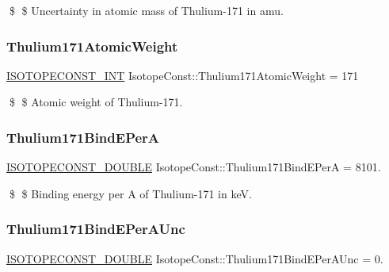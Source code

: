 \$ \$ Uncertainty in atomic mass of Thulium-\/171 in amu. \mbox{\label{group___isotope_const-_thulium-_tm171_ga094fb0dd560ff5fa86ff405571396bdb}} 
\subsubsection{\texorpdfstring{Thulium171\+Atomic\+Weight}{Thulium171AtomicWeight}}
{\footnotesize\ttfamily \mbox{\hyperlink{group___isotope_const-_macros_ga5f18360b3e99483a35c32d789e62621c}{I\+S\+O\+T\+O\+P\+E\+C\+O\+N\+S\+T\+\_\+\+I\+NT}} Isotope\+Const\+::\+Thulium171\+Atomic\+Weight = 171}

\$ \$ Atomic weight of Thulium-\/171. \mbox{\label{group___isotope_const-_thulium-_tm171_ga6b1bcd381f2644846802141e2ef363f3}} 
\subsubsection{\texorpdfstring{Thulium171\+Bind\+E\+PerA}{Thulium171BindEPerA}}
{\footnotesize\ttfamily \mbox{\hyperlink{group___isotope_const-_macros_ga8f45a7272ce02c0b4c65c44636ed719a}{I\+S\+O\+T\+O\+P\+E\+C\+O\+N\+S\+T\+\_\+\+D\+O\+U\+B\+LE}} Isotope\+Const\+::\+Thulium171\+Bind\+E\+PerA = 8101.}

\$ \$ Binding energy per A of Thulium-\/171 in keV. \mbox{\label{group___isotope_const-_thulium-_tm171_gaab34ac15ff5375667c37e4b73490b7fc}} 
\subsubsection{\texorpdfstring{Thulium171\+Bind\+E\+Per\+A\+Unc}{Thulium171BindEPerAUnc}}
{\footnotesize\ttfamily \mbox{\hyperlink{group___isotope_const-_macros_ga8f45a7272ce02c0b4c65c44636ed719a}{I\+S\+O\+T\+O\+P\+E\+C\+O\+N\+S\+T\+\_\+\+D\+O\+U\+B\+LE}} Isotope\+Const\+::\+Thulium171\+Bind\+E\+Per\+A\+Unc = 0.}

